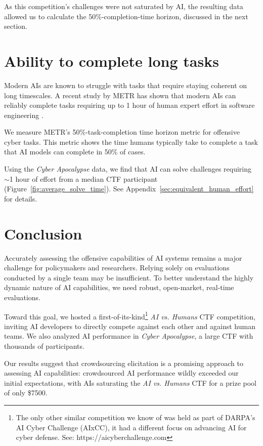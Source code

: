 \documentclass[letterpaper]{article} %
\begin{document}
As this competition's challenges were not saturated by AI, the resulting data allowed us to calculate the 50\%-completion-time horizon, discussed in the next section.
\section{Ability to complete long tasks}

Modern AIs are known to struggle with tasks that require staying coherent on long timescales. A recent study by METR has shown that modern AIs can reliably complete tasks requiring up to 1 hour of human expert effort in software engineering \cite{kwa2025measuringaiabilitycomplete}.

We measure METR's 50\%-task-completion time horizon metric for offensive cyber tasks. This metric shows the time humans typically take to complete a task that AI models can complete in 50\% of cases.

Using the \emph{Cyber Apocalypse} data, we find that AI can solve challenges requiring $\sim$1 hour of effort from a median CTF participant (Figure~\ref{fig:average_solve_time}). See Appendix~\ref{sec:equivalent_human_effort} for details.

\section{Conclusion}



Accurately assessing the offensive capabilities of AI systems remains a major challenge for policymakers and researchers. Relying solely on evaluations conducted by a single team may be insufficient. To better understand the highly dynamic nature of AI capabilities, we need robust, open-market, real-time evaluations.

Toward this goal, we hosted a first-of-its-kind\footnote{The only other similar competition we know of was held as part of DARPA's AI Cyber Challenge (AIxCC), it had a different focus on advancing AI for cyber defense. See: https://aicyberchallenge.com} \emph{AI vs. Humans} CTF competition, inviting AI developers to directly compete against each other and against human teams. We also analyzed AI performance in \emph{Cyber Apocalypse}, a large CTF with thousands of participants.

Our results suggest that crowdsourcing elicitation is a promising approach to assessing AI capabilities: crowdsourced AI performance wildly exceeded our initial expectations, with AIs saturating the \emph{AI vs. Humans} CTF for a prize pool of only \$7500.
\end{document}
